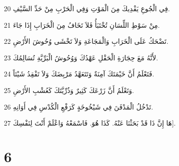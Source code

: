 \par 20 فِي الْجُوعِ يَفْدِيكَ مِنَ الْمَوْتِ وَفِي الْحَرْبِ مِنْ حَدِّ السَّيْفِ.
\par 21 مِنْ سَوْطِ اللِّسَانِ تُخْتَبَأُ فَلاَ تَخَافُ مِنَ الْخَرَابِ إِذَا جَاءَ.
\par 22 تَضْحَكُ عَلَى الْخَرَابِ وَالْمَجَاعَةِ وَلاَ تَخْشَى وُحُوشَ الأَرْضِ.
\par 23 لأَنَّهُ مَعَ حِجَارَةِ الْحَقْلِ عَهْدُكَ وَوُحُوشُ الْبَرِّيَّةِ تُسَالِمُكَ.
\par 24 فَتَعْلَمُ أَنَّ خَيْمَتَكَ آمِنَةٌ وَتَتَعَهَّدُ مَرْبِضَكَ وَلاَ تَفْقِدُ شَيْئاً.
\par 25 وَتَعْلَمُ أَنَّ زَرْعَكَ كَثِيرٌ وَذُرِّيَّتَكَ كَعُشْبِ الأَرْضِ.
\par 26 تَدْخُلُ الْمَدْفَنَ فِي شَيْخُوخَةٍ كَرَفْعِ الْكُدْسِ فِي أَوَانِهِ.
\par 27 هَا إِنَّ ذَا قَدْ بَحَثْنَا عَنْهُ. كَذَا هُوَ. فَاسْمَعْهُ وَاعْلَمْ أَنْتَ لِنَفْسِكَ].

\chapter{6}

